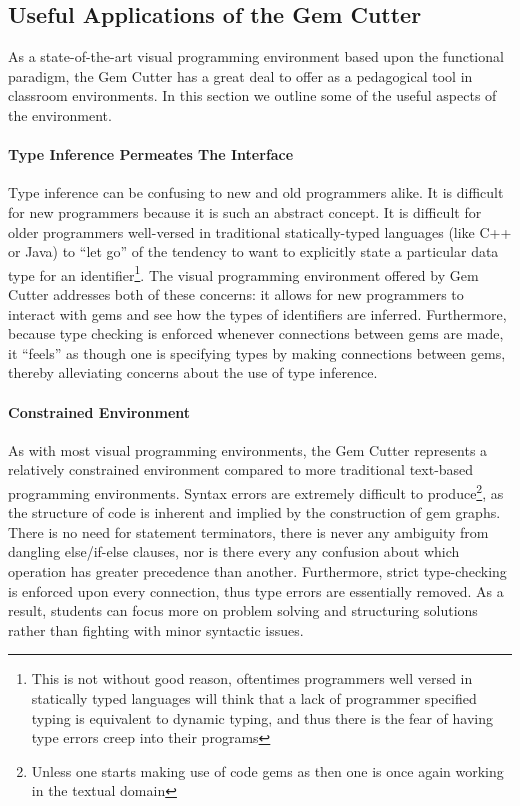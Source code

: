 \subsection{Useful Applications of the Gem Cutter}
\label{sec:gemCutterUsefulApps}

As a state-of-the-art visual programming environment based upon the functional paradigm, the Gem Cutter has a great deal to offer as a pedagogical tool in classroom environments.  In this section we outline some of the useful aspects of the environment.

\paragraph{Type Inference Permeates The Interface} 

Type inference can be confusing to new and old programmers alike.  It is difficult for new programmers because it is such an abstract concept.  It is difficult for older programmers well-versed in traditional statically-typed languages (like C++ or Java) to ``let go'' of the tendency to want to explicitly state a particular data type for an identifier\footnote{This is not without good reason, oftentimes programmers well versed in statically typed languages will think that a lack of programmer specified typing is equivalent to dynamic typing, and thus there is the fear of having type errors creep into their programs}.  The visual programming environment offered by Gem Cutter addresses both of these concerns: it allows for new programmers to interact with gems and see how the types of identifiers are inferred.  Furthermore, because type checking is enforced whenever connections between gems are made, it ``feels'' as though one is specifying types by making connections between gems, thereby alleviating concerns about the use of type inference.

\paragraph{Constrained Environment}

As with most visual programming environments, the Gem Cutter represents a relatively constrained environment compared to more traditional text-based programming environments.  Syntax errors are extremely difficult to produce\footnote{Unless one starts making use of code gems as then one is once again working in the textual domain}, as the structure of code is inherent and implied by the construction of gem graphs.  There is no need for statement terminators, there is never any ambiguity from dangling else/if-else clauses, nor is there every any confusion about which operation has greater precedence than another.  Furthermore, strict type-checking is enforced upon every connection, thus type errors are essentially removed.  As a result, students can focus more on problem solving and structuring solutions rather than fighting with minor syntactic issues.

